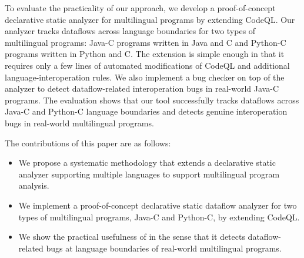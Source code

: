 To evaluate the practicality of our approach, we develop a proof-of-concept
declarative static analyzer for multilingual programs by extending CodeQL. Our
analyzer tracks dataflows across language boundaries for two types of
multilingual programs: Java-C programs written in Java and C and Python-C
programs written in Python and C. The extension is simple enough in that
it requires only a few lines of automated modifications of CodeQL and additional
language-interoperation rules. We also implement a bug checker on top of
the analyzer to detect dataflow-related interoperation bugs in real-world Java-C programs.
The evaluation shows that our tool successfully tracks dataflows across
Java-C and Python-C language boundaries and detects genuine interoperation
bugs in real-world multilingual programs.

The contributions of this paper are as follows:
\begin{itemize}
\item We propose a systematic methodology that extends a declarative static analyzer
supporting multiple languages to support multilingual program analysis.

\item We implement a proof-of-concept declarative static dataflow analyzer\inred{, \ours,} for two
types of multilingual programs, Java-C and Python-C, by extending CodeQL.

\item We show the practical usefulness of \inred{\ours} in the sense that it detects
dataflow-related bugs at language boundaries of real-world multilingual
programs.
\end{itemize}

